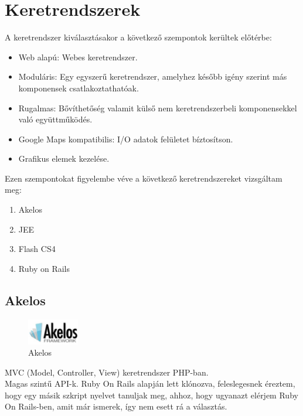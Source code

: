 	\section{Keretrendszerek}
	A keretrendszer kiválasztásakor a következő szempontok kerültek előtérbe:
	\begin{itemize}
		\item Web alapú: Webes keretrendszer.
		\item Moduláris: Egy egyszerű keretrendszer, amelyhez később igény szerint más komponensek csatlakoztathatóak.
		\item Rugalmas: Bővíthetőség valamit külső nem keretrendszerbeli komponensekkel való együttműködés.
		\item Google Maps kompatibilis: I/O adatok felületet bíztosítson.
		\item Grafikus elemek kezelése.
	\end{itemize}
	Ezen szempontokat figyelembe véve a következő keretrendszereket vizsgáltam meg:
	\begin{enumerate}
		\item Akelos
		\item JEE
		\item Flash CS4
		\item Ruby on Rails
	\end{enumerate}
	
		\subsection{Akelos} %
		\label{sub:akelos}
		
		\begin{figure}
		  \vspace{-20pt}
		  \begin{center}
		    \includegraphics[width=0.20\textwidth]{chapters/chap5/img/akelos.jpg}
		  \end{center}
		  \vspace{-20pt}
		  \caption{Akelos}
		\end{figure}
		
		MVC (Model, Controller, View) keretrendszer PHP-ban. 
		\\
		Magas szintű API-k. Ruby On Rails alapján lett klónozva, feleslegesnek éreztem, hogy
		egy másik szkript nyelvet tanuljak meg, ahhoz, hogy ugyanazt elérjem Ruby On Rails-ben, amit már ismerek, így nem esett rá a választás. 


